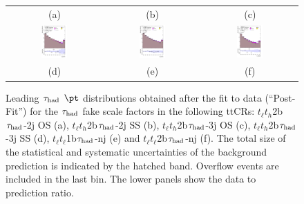 \begin{figure}[H]
\begin{tabular}{@{}ccc@{}}
(a) & (b) & (c) \\
\includegraphics[page=1,width=0.29\textwidth]{figures/ttCR/tuH_reg1l1tau2b3j_ss_log_ttCR.pdf}&
\includegraphics[page=1,width=0.29\textwidth]{figures/ttCR/tuH_reg2l1tau1bnj_log_ttCR.pdf}&
\includegraphics[page=1,width=0.29\textwidth]{figures/ttCR/tuH_reg2l1tau2bnj_log_ttCR.pdf}\\
(d) & (e) & (f)\\
\end{tabular}
\caption{Leading $\tau_\text{had}$ $\pt$  distributions obtained after the fit to data (``Post-Fit'') for the $\tau_\text{had}$ fake scale factors in the following ttCRs:
  $t_{\ell}t_{h}$2b$\tau_\text{had}$-2j OS (a), $t_{\ell}t_{h}$2b$\tau_\text{had}$-2j SS (b), $t_{\ell}t_{h}$2b$\tau_\text{had}$-3j OS (c), $t_{\ell}t_{h}$2b$\tau_\text{had}$-3j SS (d),
  $t_{\ell}t_{\ell}$1b$\tau_\text{had}$-nj (e) and $t_{\ell}t_{\ell}$2b$\tau_\text{had}$-nj (f).
  The total size of the statistical and systematic uncertainties of the background prediction is indicated by the hatched band.
  Overflow events are included in the last bin. The lower panels show the data to prediction ratio.}
\label{fig:ttCR_mtt}
\end{figure}

